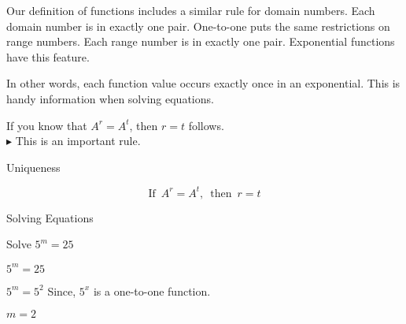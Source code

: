 \documentclass{ximera}
\begin{document}
\begin{image}
\end{image}



Our definition of functions includes a similar rule for domain numbers.  Each domain number is in exactly one pair.  One-to-one puts the same restrictions on range numbers.  Each range number is in exactly one pair.  Exponential functions have this feature.

In other words, each function value occurs exactly once in an exponential.  This is handy information when solving equations.


If you know that $A^r = A^t$, then $r=t$ follows. \\


$\blacktriangleright$ This is an important rule.


\begin{fact} Uniqueness


\[     \text{If } \,  A^r = A^t, \,  \text{ then }  \, r=t    \]


\end{fact}




\begin{example} Solving Equations


Solve $5^m = 25$



$5^m = 25$

$5^m = 5^2$    Since, $5^x$ is a one-to-one function.

$m = 2$

\end{example}
\end{document}
